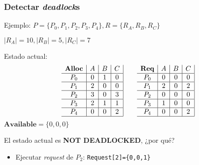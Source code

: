 \documentclass[letter]{beamer}
\begin{document}
\begin{frame}
  \frametitle{Detectar {\em deadlock}s}

  Ejemplo: $P=\{P_0,P_1,P_2,P_3,P_4\}, R=\{R_A,R_B,R_C\}$
  
  $|R_A|=10, |R_B|=5, |R_C|=7$
  
  Estado actual:
  \[
  \begin{array}{c|c|c|c|}
   \textbf{Alloc} & A & B & C \\ \hline
   P_0 & 0 & 1 & 0 \\ \hline
   P_1 & 2 & 0 & 0 \\ \hline
   P_2 & 3 & 0 & 3 \\ \hline
   P_3 & 2 & 1 & 1 \\ \hline
   P_4 & 0 & 0 & 2 \\ \hline
  \end{array}
  \qquad 
  \begin{array}{c|c|c|c|}
   \textbf{Req} & A & B & C \\ \hline
   P_0 & 0 & 0 & 0 \\ \hline
   P_1 & 2 & 0 & 2 \\ \hline
   P_2 & 0 & 0 & 0 \\ \hline
   P_3 & 1 & 0 & 0 \\ \hline
   P_4 & 0 & 0 & 2 \\ \hline
  \end{array}
  \]
  $\textbf{Available}=\{0,0,0\}$
  
  El estado actual es {\bf NOT DEADLOCKED}, ¿por qué? 
  
  \begin{itemize}
    \item<3-> Ejecutar {\em request} de $P_2$: {\tt Request[2]=\{0,0,1\}}
  \end{itemize}
\end{frame}
\end{document}
